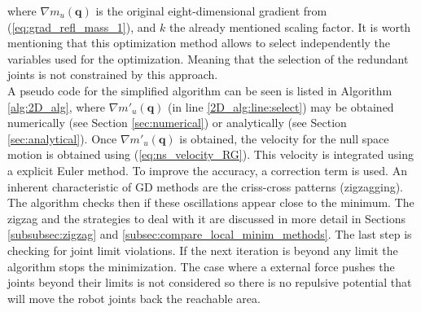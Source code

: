 where $\nabla m_u(\mathbf{q})$ is the original eight-dimensional gradient from  (\ref{eq:grad_refl_mass_1}), and $k$ the already mentioned scaling factor. 
It is worth mentioning that this optimization method allows to select independently the variables used for the optimization. Meaning that the selection of the redundant joints is not constrained by this approach. \\
%
A pseudo code for the simplified algorithm can be seen is listed in Algorithm \ref{alg:2D_alg}, where $\nabla m'_u(\mathbf{q})$ (in line \ref{2D_alg:line:select}) may be obtained numerically (see Section \ref{sec:numerical}) or analytically (see Section \ref{sec:analytical}). Once $\nabla m'_u(\mathbf{q})$ is obtained, the velocity for the null space motion is obtained using (\ref{eq:ns_velocity_RG}). This velocity is integrated using a explicit Euler method. To improve the accuracy, a correction term is used. An inherent characteristic of GD methods are the criss-cross patterns (zigzagging). The algorithm checks then if these oscillations appear  close to the minimum. The zigzag and the strategies to deal with it are discussed in more detail in Sections \ref{subsubsec:zigzag} and  \ref{subsec:compare_local_minim_methods}.
The last step is checking for joint limit violations. If the next iteration is beyond any limit the algorithm stops the  minimization. The case where a external force pushes the joints beyond their limits is not considered so there is no repulsive potential that will move the robot joints back the reachable area. 


